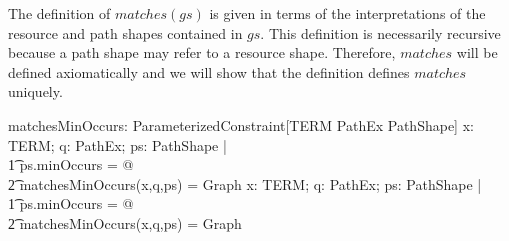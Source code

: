 The definition of $matches(gs)$ is given in terms of the interpretations of the resource and path shapes contained in $gs$.
This definition is necessarily recursive because a path shape may refer to a resource shape.
Therefore, $matches$ will be defined axiomatically and we will show that the definition defines $matches$ uniquely.

\begin{axdef}
matchesMinOccurs: ParameterizedConstraint[TERM \cross PathEx \cross PathShape]
\where
\forall x: TERM; q: PathEx; ps: PathShape | \\
\t1	ps.minOccurs = \emptyset @ \\
\t2		matchesMinOccurs(x,q,ps) = Graph
\also
\forall x: TERM; q: PathEx; ps: PathShape | \\
\t1	ps.minOccurs = \emptyset @ \\
\t2		matchesMinOccurs(x,q,ps) = Graph
\end{axdef}

